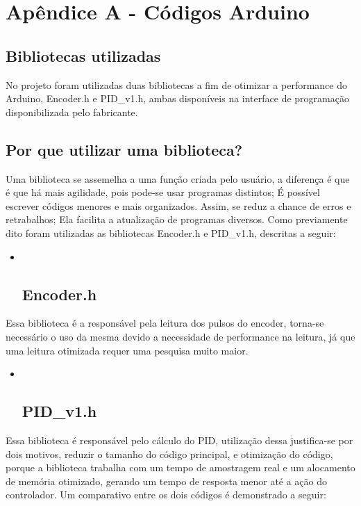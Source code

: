 \documentclass[]{article}
\begin{document}
\section{Apêndice A - Códigos
Arduino}\label{apuxeandice-a---cuxf3digos-arduino}

\subsection{Bibliotecas utilizadas}\label{bibliotecas-utilizadas}

No projeto foram utilizadas duas bibliotecas a fim de otimizar a
performance do Arduino, Encoder.h e PID\_v1.h, ambas disponíveis na
interface de programação disponibilizada pelo fabricante.

\subsection{Por que utilizar uma
biblioteca?}\label{por-que-utilizar-uma-biblioteca}

Uma biblioteca se assemelha a uma função criada pelo usuário, a
diferença é que é que há mais agilidade, pois pode-se usar programas
distintos; É possível escrever códigos menores e mais organizados.
Assim, se reduz a chance de erros e retrabalhos; Ela facilita a
atualização de programas diversos. Como previamente dito foram
utilizadas as bibliotecas Encoder.h e PID\_v1.h, descritas a seguir:

\begin{itemize}
\item ~
  \subsection{Encoder.h}\label{encoder.h}
\end{itemize}

Essa biblioteca é a responsável pela leitura dos pulsos do encoder,
torna-se necessário o uso da mesma devido a necessidade de performance
na leitura, já que uma leitura otimizada requer uma pesquisa muito
maior.

\begin{itemize}
\item ~
  \subsection{PID\_v1.h}\label{pid_v1.h}
\end{itemize}

Essa biblioteca é responsável pelo cálculo do PID, utilização dessa
justifica-se por dois motivos, reduzir o tamanho do código principal, e
otimização do código, porque a biblioteca trabalha com um tempo de
amostragem real e um alocamento de memória otimizado, gerando um tempo
de resposta menor até a ação do controlador. Um comparativo entre os
dois códigos é demonstrado a seguir:
\end{document}
